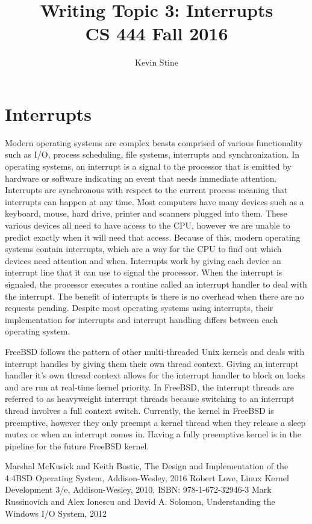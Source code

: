 \documentclass[letterpaper,10pt,draftclsnofoot,onecolumn,titlepage]{IEEEtran}
\def\name{Kevin Stine}
\begin{document}
	\title{\huge Writing Topic 3: Interrupts\\CS 444 Fall 2016}
	\author{\large \name}
	\maketitle
	\newpage
	\section*{Interrupts}
		Modern operating systems are complex beasts comprised of various functionality such as I/O, process scheduling, file systems, interrupts and synchronization.
	  In operating systems, an interrupt is a signal to the processor that is emitted by hardware or software indicating an event that needs immediate attention.
		Interrupts are synchronous with respect to the current process meaning that interrupts can happen at any time.
		Most computers have many devices such as a keyboard, mouse, hard drive, printer and scanners plugged into them.
		These various devices all need to have access to the CPU, however we are unable to predict exactly when it will need that access.
		Because of this, modern operating systems contain interrupts, which are a way for the CPU to find out which devices need attention and when.
		Interrupts work by giving each device an interrupt line that it can use to signal the processor.
		When the interrupt is signaled, the processor executes a routine called an interrupt handler to deal with the interrupt.
		The benefit of interrupts is there is no overhead when there are no requests pending.
		Despite most operating systems using interrupts, their implementation for interrupts and interrupt handling differs between each operating system.

		FreeBSD follows the pattern of other multi-threaded Unix kernels and deals with interrupt handles by giving them their own thread context.
		Giving an interrupt handler it's own thread context allows for the interrupt handler to block on locks and are run at real-time kernel priority.
		In FreeBSD, the interrupt threads are referred to as heavyweight interrupt threads because switching to an interrupt thread involves a full context switch.
		Currently, the kernel in FreeBSD is preemptive, however they only preempt a kernel thread when they release a sleep mutex or when an interrupt comes in.
		Having a fully preemptive kernel is in the pipeline for the future FreeBSD kernel.

	\clearpage

	\begin{thebibliography}{3}
			Marshal McKusick and Keith Bostic,
			The Design and Implementation of the 4.4BSD Operating System,
			Addison-Wesley,
			2016
			Robert Love,
			Linux Kernel Development 3/e,
			Addison-Wesley,
			2010,
			ISBN: 978-1-672-32946-3
			Mark Russinovich and Alex Ionescu and David A. Solomon,
			Understanding the Windows I/O System,
			2012
	\end{thebibliography}
\end{document}
